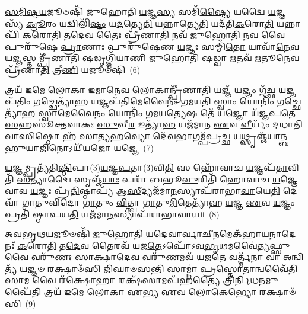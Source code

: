 {\anuvakamend[{𑌹𑌿𑌰᳴\-\ul{𑌣𑍍𑌯}\-\-\ul{𑍞} 𑌰𑌾𑌧𑍋᳴ 𑌰𑌾𑌧𑍍𑌯𑌾𑌸\-\ul{𑌮}\-𑌮𑍁\-\ul{𑌤𑍍𑌰} 𑌮𑌧𑍁᳴𑌮\-\ul{𑌤𑍀}\-𑌰𑌾 𑌵𑌿᳴\-\ul{𑌶}\-𑌤𑍇\-\ul{𑌤𑍍𑌯}\-𑌷𑍍𑌟𑌾𑌤𑍍𑌰𑌿𑍞᳴𑌶𑌚𑍍𑌚}]}%

\-\ul{𑌸}\-\-\ul{𑌮𑌿}\-\-\ul{𑌷𑍍𑌟}\-\-\ul{𑌯}\-𑌜𑍂𑍞𑌷𑌿᳴ 𑌜𑍁𑌹𑍋𑌤𑌿 \ul{𑌯}\-𑌜𑍍𑌞\-\ul{𑌸𑍍𑌯} 𑌸𑌮𑌿᳴\-\ul{𑌷𑍍𑌟𑍍𑌯𑍈} 𑌯𑌦𑍍𑌵𑍈 \ul{𑌯}\-𑌜𑍍𑌞𑌸𑍍𑌯᳴ \ul{𑌕𑍍𑌰𑍂}\-𑌰𑌂 𑌯𑌦𑍍𑌵𑌿𑌲𑌿᳴\-\ul{𑌷𑍍𑌟𑌂} 𑌯\-\ul{𑌦}\-𑌤𑍍𑌯𑍇\-\ul{𑌤𑌿} 𑌯𑌨𑍍𑌨𑌾𑌤𑍍𑌯𑍇\-\ul{𑌤𑌿} 𑌯𑌦᳴𑌤𑌿\-\ul{𑌕}\-𑌰𑍋\-\ul{𑌤𑌿} 𑌯𑌨𑍍𑌨𑌾𑌪𑌿᳴ \ul{𑌕}\-𑌰𑍋\-\ul{𑌤𑌿} 𑌤\-\ul{𑌦𑍇}\-𑌵 𑌤𑍈𑌃 𑌪𑍍𑌰𑍀᳴𑌣𑌾\-\ul{𑌤𑌿} 𑌨𑌵᳴ 𑌜𑍁𑌹𑍋\-\ul{𑌤𑌿} 𑌨\-\ul{𑌵} 𑌵𑍈 𑌪𑍁𑌰𑍁᳴𑌷𑍇 \ul{𑌪𑍍𑌰𑌾}\-𑌣𑌾𑌃 𑌪𑍁𑌰𑍁᳴𑌷𑍇𑌣 \ul{𑌯}\-𑌜𑍍𑌞𑌃 𑌸𑌮𑍍𑌮𑌿᳴\-\ul{𑌤𑍋} 𑌯𑌾𑌵𑌾᳴\-\ul{𑌨𑍇}\-𑌵 \ul{𑌯}\-𑌜𑍍𑌞𑌸𑍍𑌤𑌮𑍍𑌪𑍍𑌰𑍀᳴𑌣𑌾\-\ul{𑌤𑌿} 𑌷𑌡𑍃𑌗𑍍𑌮𑌿᳴𑌯𑌾𑌣𑌿 𑌜𑍁𑌹𑍋\-\ul{𑌤𑌿} 𑌷𑌡𑍍𑌵𑌾 \ul{𑌋}\-𑌤𑌵᳴ \ul{𑌋}\-𑌤𑍂\-\ul{𑌨𑍇}\-𑌵 𑌪𑍍𑌰𑍀᳴𑌣𑌾\-\ul{𑌤𑌿} 𑌤𑍍𑌰𑍀\-\ul{𑌣𑌿} 𑌯𑌜𑍂𑍞᳴𑌷𑌿~(6)

𑌤𑍍𑌰𑌯᳴ \ul{𑌇}\-𑌮𑍇 \ul{𑌲𑍋}\-𑌕𑌾 \ul{𑌇}\-𑌮𑌾\-\ul{𑌨𑍇}\-𑌵 \ul{𑌲𑍋}\-𑌕𑌾𑌨𑍍𑌪𑍍𑌰𑍀᳴𑌣𑌾\-\ul{𑌤𑌿} 𑌯𑌜𑍍𑌞᳴ \ul{𑌯}\-𑌜𑍍𑌞𑌂 𑌗᳴𑌚𑍍𑌛 \ul{𑌯}\-𑌜𑍍𑌞𑌪᳴𑌤𑌿𑌂 \ul{𑌗}\-𑌚𑍍𑌛𑍇𑌤𑍍𑌯𑌾᳴𑌹 \ul{𑌯}\-𑌜𑍍𑌞𑌪᳴𑌤𑌿\-\ul{𑌮𑍇}\-𑌵𑍈𑌨𑌂᳴ 𑌗𑌮𑌯\-\ul{𑌤𑌿} 𑌸𑍍𑌵𑌾𑌂 𑌯𑍋𑌨𑌿𑌂᳴ \ul{𑌗}\-𑌚𑍍𑌛𑍇𑌤𑍍𑌯𑌾᳴\-\ul{𑌹} 𑌸𑍍𑌵𑌾\-\ul{𑌮𑍇}\-𑌵𑍈\-\ul{𑌨𑌂} 𑌯𑍋𑌨𑌿𑌂᳴ 𑌗𑌮𑌯\-\ul{𑌤𑍍𑌯𑍇}\-𑌷 𑌤𑍇᳴ \ul{𑌯}\-𑌜𑍍𑌞𑍋 𑌯᳴𑌜𑍍𑌞𑌪𑌤𑍇 \ul{𑌸}\-𑌹𑌸𑍂॑𑌕𑍍𑌤𑌵𑌾𑌕𑌃 \ul{𑌸𑍁}\-𑌵𑍀\-\ul{𑌰} 𑌇𑌤𑍍𑌯𑌾᳴\-\ul{𑌹} 𑌯𑌜᳴𑌮𑌾𑌨 \ul{𑌏}\-𑌵 \ul{𑌵𑍀}\-𑌰𑍍𑌯𑌂᳴ 𑌦𑌧𑌾𑌤𑌿 𑌵𑌾\-\ul{𑌸𑌿}\-𑌷𑍍𑌠𑍋 𑌹᳴ 𑌸𑌾𑌤𑍍𑌯\-\ul{𑌹}\-𑌵𑍍𑌯𑍋 𑌦𑍇᳴𑌵\-\ul{𑌭𑌾}\-𑌗𑌮𑍍𑌪᳴𑌪𑍍𑌰\-\ul{𑌚𑍍𑌛} 𑌯𑌥𑍍𑌸𑍃𑌞𑍍𑌜᳴𑌯𑌾𑌨𑍍𑌬𑌹𑍁\-\ul{𑌯𑌾}\-𑌜𑌿𑌨𑍋\-𑌽𑌯𑍀᳴𑌯𑌜𑍋 \ul{𑌯}\-𑌜𑍍𑌞𑍇~(7)

\-\ul{𑌯}\-𑌜𑍍𑌞𑌮𑍍𑌪𑍍𑌰𑌤𑍍𑌯᳴𑌤𑌿\-\ul{𑌷𑍍𑌠𑌿}\-𑌪𑌾(3)\-\ul{𑌯}\-𑌜𑍍𑌞\-\ul{𑌪}\-𑌤𑌾(3)𑌵𑌿\-\ul{𑌤𑌿} 𑌸 𑌹𑍋᳴𑌵𑌾𑌚 \ul{𑌯}\-𑌜𑍍𑌞𑌪᳴\-\ul{𑌤𑌾}\-𑌵𑌿𑌤𑌿᳴ \ul{𑌸}\-𑌤𑍍𑌯𑌾𑌦𑍍𑌵𑍈 𑌸𑍃𑌞𑍍𑌜᳴\-\ul{𑌯𑌾𑌃} 𑌪𑌰𑌾᳴ 𑌬𑌭𑍂\-\ul{𑌵𑍁}\-𑌰𑌿𑌤𑌿᳴ 𑌹𑍋𑌵𑌾𑌚 \ul{𑌯}\-𑌜𑍍𑌞𑍇 𑌵𑌾𑌵 \ul{𑌯}\-𑌜𑍍𑌞𑌃 𑌪𑍍𑌰᳴\-\ul{𑌤𑌿}\-𑌷𑍍𑌠𑌾𑌪𑍍𑌯᳴ 𑌆\-\ul{𑌸𑍀}\-𑌦𑍍𑌯𑌜᳴𑌮𑌾\-\ul{𑌨}\-𑌸𑍍𑌯𑌾𑌪᳴𑌰𑌾𑌭𑌾\-\ul{𑌵𑌾}\-𑌯𑍇\-\ul{𑌤𑌿} 𑌦𑍇𑌵𑌾᳴ 𑌗𑌾𑌤𑍁𑌵𑌿𑌦𑍋 \ul{𑌗𑌾}\-𑌤𑍁𑌂 \ul{𑌵𑌿}\-𑌤𑍍𑌤𑍍𑌵𑌾 \ul{𑌗𑌾}\-𑌤𑍁\-\ul{𑌮𑌿}\-𑌤𑍇𑌤𑍍𑌯𑌾᳴𑌹 \ul{𑌯}\-𑌜𑍍𑌞 \ul{𑌏}\-𑌵 \ul{𑌯}\-𑌜𑍍𑌞𑌂 𑌪𑍍𑌰𑌤𑌿᳴ 𑌷𑍍𑌠𑌾𑌪𑌯\-\ul{𑌤𑌿} 𑌯𑌜᳴𑌮𑌾\-\ul{𑌨}\-𑌸𑍍𑌯𑌾𑌪᳴𑌰𑌾𑌭𑌾𑌵𑌾𑌯॥~(8)

{\anuvakamend[{𑌯𑌜𑍂𑍞᳴𑌷𑌿 \ul{𑌯}\-𑌜𑍍𑌞 𑌏𑌕᳴𑌚𑌤𑍍𑌵𑌾𑌰𑌿𑍞𑌶𑌚𑍍𑌚}]}%

\-\ul{𑌅}\-\-\ul{𑌵}\-\-\ul{𑌭𑍃}\-\-\ul{𑌥}\-\-\ul{𑌯}\-𑌜𑍂𑍞𑌷𑌿᳴ 𑌜𑍁𑌹𑍋\-\ul{𑌤𑌿} 𑌯\-\ul{𑌦𑍇}\-𑌵𑌾\-\ul{𑌰𑍍𑌵𑌾}\-𑌚𑍀\-\ul{𑌨}\-𑌮𑍇𑌕᳴𑌹𑌾𑌯\-\ul{𑌨𑌾}\-𑌦𑍇𑌨𑌃᳴ \ul{𑌕}\-𑌰𑍋\-\ul{𑌤𑌿} 𑌤\-\ul{𑌦𑍇}\-𑌵 𑌤𑍈𑌰𑌵᳴ 𑌯𑌜\-\ul{𑌤𑍇}\-\-𑌽𑌪𑍋᳴\-𑌽𑌵\-\ul{𑌭𑍃}\-𑌥𑌮𑌵𑍈॑\-\ul{𑌤𑍍𑌯}\-𑌫𑍍𑌸𑍁 𑌵𑍈 𑌵𑌰𑍁᳴𑌣𑌃 \ul{𑌸𑌾}\-𑌕𑍍𑌷𑌾\-\ul{𑌦𑍇}\-𑌵 𑌵𑌰𑍁᳴\-\ul{𑌣}\-𑌮𑌵᳴ 𑌯𑌜\-\ul{𑌤𑍇} 𑌵𑌰𑍍𑌤𑍍𑌮᳴\-\ul{𑌨𑌾} 𑌵𑌾 \ul{𑌅}\-𑌨𑍍𑌵𑌿𑌤𑍍𑌯᳴ \ul{𑌯}\-𑌜𑍍𑌞𑍞 𑌰𑌕𑍍𑌷𑌾𑍞᳴𑌸𑌿 𑌜𑌿𑌘𑌾𑍞𑌸\-\ul{𑌨𑍍𑌤𑌿} 𑌸𑌾𑌮𑍍𑌨𑌾॑ 𑌪𑍍𑌰\-\ul{𑌸𑍍𑌤𑍋}\-𑌤𑌾𑌨𑍍𑌵𑌵𑍈᳴\-\ul{𑌤𑌿} 𑌸𑌾\-\ul{𑌮} 𑌵𑍈 𑌰᳴\-\ul{𑌕𑍍𑌷𑍋}\-𑌹𑌾 𑌰𑌕𑍍𑌷᳴\-\ul{𑌸𑌾}\-𑌮𑌪᳴𑌹\-\ul{𑌤𑍍𑌯𑍈} 𑌤𑍍𑌰𑌿\-\ul{𑌰𑍍𑌨𑌿}\-𑌧\-\ul{𑌨}\-𑌮𑍁𑌪𑍈᳴\-\ul{𑌤𑌿} 𑌤𑍍𑌰𑌯᳴ \ul{𑌇}\-𑌮𑍇 \ul{𑌲𑍋}\-𑌕𑌾 \ul{𑌏}\-𑌭𑍍𑌯 \ul{𑌏}\-𑌵 \ul{𑌲𑍋}\-𑌕𑍇\-\ul{𑌭𑍍𑌯𑍋} 𑌰𑌕𑍍𑌷𑌾𑍞᳴𑌸𑌿~(9)

